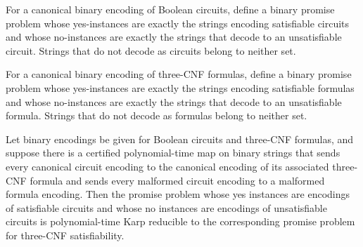 \begin{definition}
\label{FABL.CircuitThreeCNFPolytimeAdapter.circuitSatPromise}
\leanok
{}
For a canonical binary encoding of Boolean circuits, define a binary promise problem
whose yes-instances are exactly the strings encoding satisfiable circuits and whose
no-instances are exactly the strings that decode to an unsatisfiable circuit. Strings
that do not decode as circuits belong to neither set.
\end{definition}

\begin{definition}
\label{FABL.CircuitThreeCNFPolytimeAdapter.threeCNFSatPromise}
\leanok
{}
For a canonical binary encoding of three-CNF formulas, define a binary promise problem
whose yes-instances are exactly the strings encoding satisfiable formulas and whose
no-instances are exactly the strings that decode to an unsatisfiable formula. Strings
that do not decode as formulas belong to neither set.
\end{definition}

\begin{theorem}
\label{FABL.CircuitThreeCNFPolytimeAdapter.promiseKarpReducible}
\leanok
{}
Let binary encodings be given for Boolean circuits and three-CNF formulas, and suppose
there is a certified polynomial-time map on binary strings that sends every canonical
circuit encoding to the canonical encoding of its associated three-CNF formula and sends
every malformed circuit encoding to a malformed formula encoding. Then the promise
problem whose yes instances are encodings of satisfiable circuits and whose no instances
are encodings of unsatisfiable circuits is polynomial-time Karp reducible to the
corresponding promise problem for three-CNF satisfiability.
\end{theorem}

